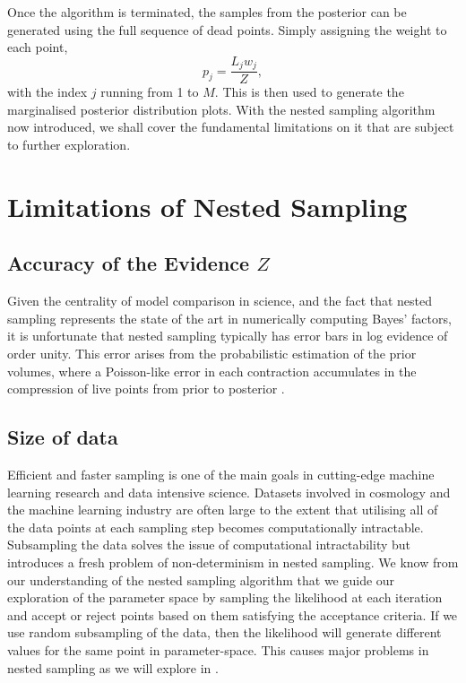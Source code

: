 Once the algorithm is terminated, the samples from the posterior can be generated using the full sequence of dead points. Simply assigning the weight to each point,
%
\begin{equation}
    p_j= \frac{L_j w_j}{Z},
\end{equation}
%
with the index $j$ running from 1 to $M$. This is then used to generate the marginalised posterior distribution plots. With the nested sampling algorithm now introduced, we shall cover the fundamental limitations on it that are subject to further exploration. 


\section{Limitations of Nested Sampling}\label{sec:limitations}

\subsection{Accuracy of the Evidence $Z$}\label{sec:evidence_accuracy}

Given the centrality of model comparison in science, and the fact that nested sampling represents the state of the art in numerically computing Bayes' factors, it is unfortunate that nested sampling typically has error bars in log evidence of order unity. This error arises from the probabilistic estimation of the prior volumes, where a Poisson-like error in each contraction accumulates in the compression of live points from prior to posterior . 



\subsection{Size of data}\label{sec:size_of_data}

Efficient and faster sampling is one of the main goals in cutting-edge machine learning research and data intensive science. Datasets involved in cosmology and the machine learning industry are often large to the extent that utilising all of the data points at each sampling step becomes computationally intractable. Subsampling the data solves the issue of computational intractability but introduces a fresh problem of non-determinism in nested sampling. We know from our understanding of the nested sampling algorithm that we guide our exploration of the parameter space by sampling the likelihood at each iteration and accept or reject points based on them satisfying the acceptance criteria. If we use random subsampling of the data, then the likelihood will generate different values for the same point in parameter-space. This causes major problems in nested sampling as we will explore in .



